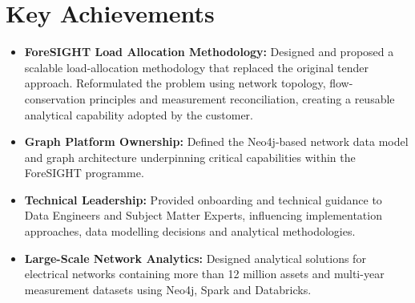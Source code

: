 \documentclass[letterpaper,11pt]{article}
\newcommand{\resumeSubHeadingListStart}{\begin{itemize}[leftmargin=*]}
\newcommand{\resumeSubHeadingListEnd}{\end{itemize}}
\begin{document}
\section{Key Achievements} 
    \resumeSubHeadingListStart 
    \item{ \textbf{ForeSIGHT Load Allocation Methodology:} Designed and proposed a scalable load-allocation methodology that replaced the original tender approach. Reformulated the problem using network topology, flow-conservation principles and measurement reconciliation, creating a reusable analytical capability adopted by the customer. } 
    \item{ \textbf{Graph Platform Ownership:} Defined the Neo4j-based network data model and graph architecture underpinning critical capabilities within the ForeSIGHT programme. } 
    \item{ \textbf{Technical Leadership:} Provided onboarding and technical guidance to Data Engineers and Subject Matter Experts, influencing implementation approaches, data modelling decisions and analytical methodologies.} 
    \item{ \textbf{Large-Scale Network Analytics:} Designed analytical solutions for electrical networks containing more than 12 million assets and multi-year measurement datasets using Neo4j, Spark and Databricks. } 
\resumeSubHeadingListEnd

\end{document}
